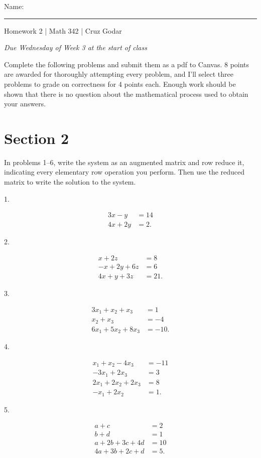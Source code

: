 \documentclass{article}
\begin{document}
\Large Name: \rule{2in}{0.15mm} \hfill Homework 2 | Math 342 | Cruz Godar \vspace{4pt} \normalsize

\textit{Due Wednesday of Week 3 at the start of class}

Complete the following problems and submit them as a pdf to Canvas. 8 points are awarded for thoroughly attempting every problem, and I'll select three problems to grade on correctness for 4 points each. Enough work should be shown that there is no question about the mathematical process used to obtain your answers.

\section{Section 2}

In problems 1--6, write the system as an augmented matrix and row reduce it, indicating every elementary row operation you perform. Then use the reduced matrix to write the solution to the system.

1.

\begin{align*}
	3x - y &= 14\\
	4x + 2y &= 2.
\end{align*}

2.

\begin{align*}
	x + 2z &= 8\\
	-x + 2y + 6z &= 6\\
	4x + y + 3z &= 21.
\end{align*}

3.

\begin{align*}
	3x_1 + x_2 + x_3 &= 1\\
	x_2 + x_3 &= -4\\
	6x_1 + 5x_2 + 8x_3 &= -10.
\end{align*}

4.

\begin{align*}
	x_1 + x_2 - 4x_3 &= -11\\
	-3x_1 + 2x_3 &= 3\\
	2x_1 + 2x_2 + 2x_3 &= 8\\
	-x_1 + 2x_2 &= 1.
\end{align*}

5.

\begin{align*}
	a + c &= 2\\
	b + d &= 1\\
	a + 2b + 3c + 4d &= 10\\
	4a + 3b + 2c + d &= 5.
\end{align*}
\end{document}
